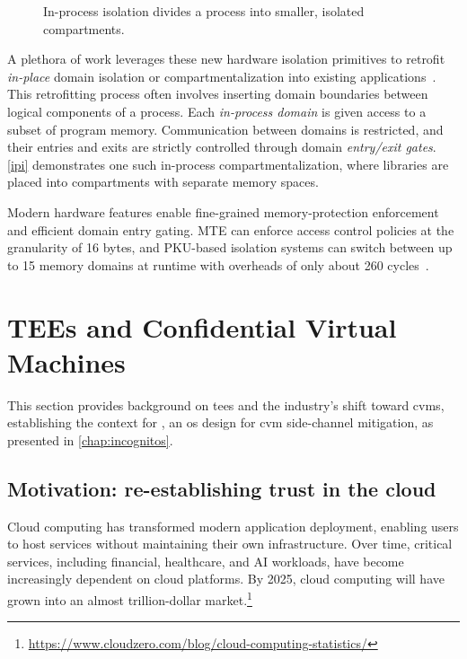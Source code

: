 \begin{figure}
	\centering
	
	\caption{In-process isolation divides a process into smaller, isolated compartments.}\label{ipi}
\end{figure}

A plethora of work leverages these new hardware isolation primitives to retrofit \emph{in-place} domain isolation or compartmentalization into existing applications~\cite{erim,hodor,cerberus,jenny,ghosn2021enclosure,cryptompk,chen2016shreds}.
This retrofitting process often involves inserting domain boundaries between logical components of a process.
Each \emph{in-process domain} is given access to a subset of program memory.
Communication between domains is restricted, and their entries and exits are strictly controlled through domain \emph{entry/exit gates}.
\autoref{ipi} demonstrates one such in-process compartmentalization, where libraries are placed into compartments with separate memory spaces.

Modern hardware features enable fine-grained memory-protection enforcement and efficient domain entry gating.
MTE can enforce access control policies at the granularity of 16 bytes, and PKU-based isolation systems can switch between up to 15 memory domains at runtime with overheads of only about 260 cycles~\cite{erim}.



\clearpage

\section{TEEs and Confidential Virtual Machines}\label{sec:intro:bg-cvm}

This section provides background on \glspl{tee} and the industry's shift toward \glspl{cvm}, establishing the context for \incognitos, an \gls{os} design for \gls{cvm} side-channel mitigation, as presented in \cref{chap:incognitos}.

\subsection{Motivation: re-establishing trust in the cloud}

Cloud computing has transformed modern application deployment, enabling users to host services without maintaining their own infrastructure.
Over time, critical services, including financial, healthcare, and AI workloads, have become increasingly dependent on cloud platforms. 
By 2025, cloud computing will have grown into an almost trillion-dollar market.\footnote{\url{https://www.cloudzero.com/blog/cloud-computing-statistics/}}

